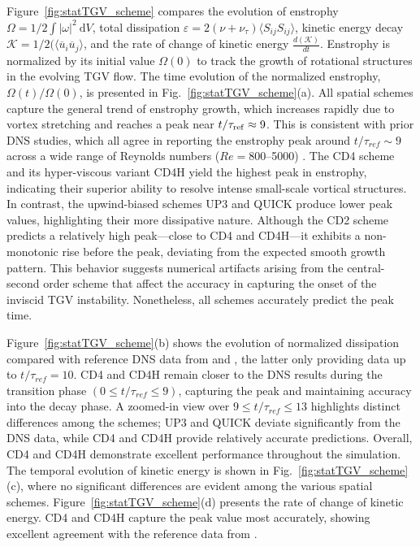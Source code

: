 \documentclass[final,3p]{elsarticle}
\begin{document}
Figure~\ref{fig:statTGV_scheme} compares the evolution of enstrophy $\Omega = 1/2 \int |\omega|^2~\mathrm{d}V$, total dissipation $\varepsilon = 2 (\nu + \nu_{\tau})\langle S_{ij} S_{ij}\rangle$, kinetic energy decay $\mathcal{K}=1/2(\langle \overline{u}_i \overline{u}_j\rangle$, and the rate of change of kinetic energy $\frac{d(\mathcal{K})}{dt}$. Enstrophy is normalized by its initial value $\Omega(0)$ to track the growth of rotational structures in the evolving TGV flow. The time evolution of the normalized enstrophy, $\Omega(t)/\Omega(0)$, is presented in Fig.~\ref{fig:statTGV_scheme}(a). All spatial schemes capture the general trend of enstrophy growth, which increases rapidly due to vortex stretching and reaches a peak near $t/\tau_{\rm ref} \approx 9$. This is consistent with prior DNS studies, which all agree in reporting the enstrophy peak around $t/\tau_{ref} \sim 9$ across a wide range of Reynolds numbers ($Re = 800$–5000) \cite{brachet1983small,brachet1991direct,drikakis2007simulation,sharma2019vorticity,abdelsamie2021taylor}. The CD4 scheme and its hyper-viscous variant CD4H yield the highest peak in enstrophy, indicating their superior ability to resolve intense small-scale vortical structures. In contrast, the upwind-biased schemes UP3 and QUICK produce lower peak values, highlighting their more dissipative nature. Although the CD2 scheme predicts a relatively high peak—close to CD4 and CD4H—it exhibits a non-monotonic rise before the peak, deviating from the expected smooth growth pattern. This behavior suggests numerical artifacts arising from the central-second order scheme that affect the accuracy in capturing the onset of the inviscid TGV instability. Nonetheless, all schemes accurately predict the peak time.

Figure~\ref{fig:statTGV_scheme}(b) shows the evolution of normalized dissipation compared with reference DNS data from \citet{abdelsamie2021taylor} and \citet{brachet1983small}, the latter only providing data up to $t/\tau_{ref} = 10$. CD4 and CD4H remain closer to the DNS results during the transition phase $(0 \leq t/\tau_{ref} \leq 9)$, capturing the peak and maintaining accuracy into the decay phase. A zoomed-in view over $9 \leq t/\tau_{ref} \leq 13$ highlights distinct differences among the schemes; UP3 and QUICK deviate significantly from the DNS data, while CD4 and CD4H provide relatively accurate predictions. Overall, CD4 and CD4H demonstrate excellent performance throughout the simulation. The temporal evolution of kinetic energy is shown in Fig.~\ref{fig:statTGV_scheme}(c), where no significant differences are evident among the various spatial schemes. Figure~\ref{fig:statTGV_scheme}(d) presents the rate of change of kinetic energy. CD4 and CD4H capture the peak value most accurately, showing excellent agreement with the reference data from \citet{brachet1983small}.
\end{document}

